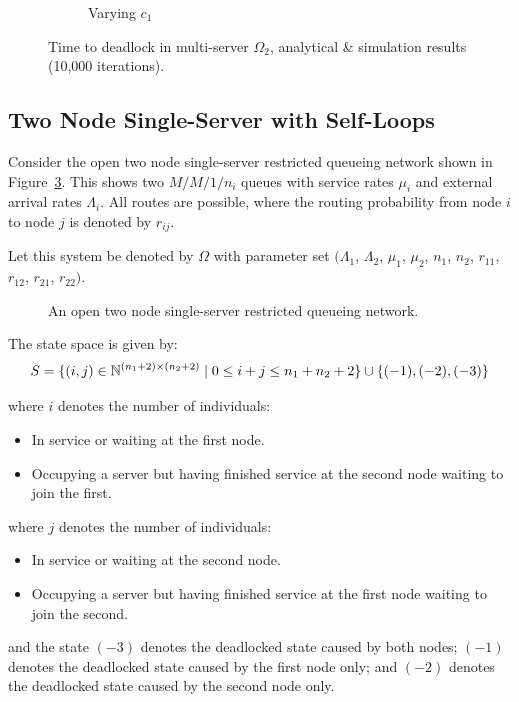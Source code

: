 \documentclass{article}
\numberwithin{equation}{section}
\begin{document}
\begin{figure}[!htbp]
\begin{center}
\begin{subfigure}[b]{0.48\textwidth}
    \caption{Varying $c_1$}
    \label{fig:2Nms_c}
  \end{subfigure}
  \end{center}
  \caption{Time to deadlock in multi-server $\Omega_2$, analytical \&
  simulation results (10,000 iterations).}
  \label{fig:timestodeadlock2nodemultiserver}
\end{figure}


\subsection{Two Node Single-Server with Self-Loops}\label{sec:2nodeselfloops}

Consider the open two node single-server restricted queueing network shown in
Figure~\ref{fig:queueingnetwork_2nodesfeedback}.
This shows two \(M/M/1/n_i\) queues with service rates $\mu_i$  and external
arrival rates $\Lambda_i$.
All routes are possible, where the routing probability from node $i$ to node
$j$ is denoted by $r_{ij}$.

Let this system be denoted by $\Omega$ with parameter set $(\Lambda_1$,
$\Lambda_2$, $\mu_1$, $\mu_2$, $n_1$, $n_2$, $r_{11}$, $r_{12}$, $r_{21}$,
$r_{22})$.

\begin{figure}[!htbp]
  \begin{center}
  
  \end{center}
  \caption{An open two node single-server restricted queueing network.}
  \label{fig:queueingnetwork_2nodesfeedback}
\end{figure}

The state space is given by:
    \[S = \{(i,j)\in\mathbb{N}^{(n_1+2)\times (n_2+2)} \nonscript\; | \nonscript\; 0 \leq i + j \leq n_1 + n_2 + 2
    \}\cup\{(-1), (-2), (-3)\}\]

    where \(i\) denotes the number of individuals:
        \begin{itemize}
            \item In service or waiting at the first node.
            \item Occupying a server but having finished service at the
                second node waiting to join the first.
        \end{itemize}
    where \(j\) denotes the number of individuals:
        \begin{itemize}
            \item In service or waiting at the second node.
            \item Occupying a server but having finished service at the
                first node waiting to join the second.
        \end{itemize}
    and the state $(-3)$ denotes the deadlocked state caused by both nodes;
    $(-1)$ denotes the deadlocked state caused by the first node only; and
    $(-2)$ denotes the deadlocked state caused by the second node only.
\end{document}
